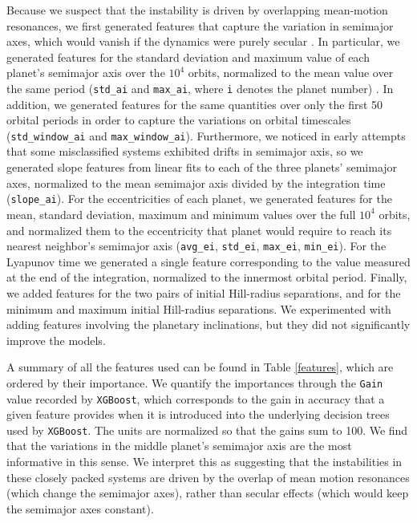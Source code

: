 Because we suspect that the instability is driven by overlapping mean-motion resonances, we first generated features that capture the variation in semimajor axes, which would vanish if the dynamics were purely secular \citep{SSD1999}.  
In particular, we generated features for the standard deviation and maximum value of each planet's semimajor axis over the $10^4$ orbits, normalized to the mean value over the same period  ({\tt std\_ai} and {\tt max\_ai}, where {\tt i} denotes the planet number) .  
In addition, we generated features for the same quantities over only the first 50 orbital periods in order to capture the variations on orbital timescales ({\tt std\_window\_ai} and {\tt max\_window\_ai}).
Furthermore, we noticed in early attempts that some misclassified systems exhibited drifts in semimajor axis, so we generated slope features from linear fits to each of the three planets' semimajor axes, normalized to the mean semimajor axis divided by the integration time ({\tt slope\_ai}).
For the eccentricities of each planet, we generated features for the mean, standard deviation, maximum and minimum values over the full $10^4$ orbits, and normalized them to the eccentricity that planet would require to reach its nearest neighbor's semimajor axis ({\tt avg\_ei}, {\tt std\_ei}, {\tt max\_ei}, {\tt min\_ei}).
For the Lyapunov time we generated a single feature corresponding to the value measured at the end of the integration, normalized to the innermost orbital period.
Finally, we added features for the two pairs of initial Hill-radius separations, and for the minimum and maximum initial Hill-radius separations.
We experimented with adding features involving the planetary inclinations, but they did not significantly improve the models.

A summary of all the features used can be found in Table \ref{features}, which are ordered by their importance.
We quantify the importances through the {\tt Gain} value recorded by {\tt XGBoost}, which corresponds to the gain in accuracy that a given feature provides when it is introduced into the underlying decision trees used by {\tt XGBoost}.  
The units are normalized so that the gains sum to 100.
We find that the variations in the middle planet's semimajor axis are the most informative in this sense.
We interpret this as suggesting that the instabilities in these closely packed systems are driven by the overlap of mean motion resonances (which change the semimajor axes), rather than secular effects (which would keep the semimajor axes constant).

